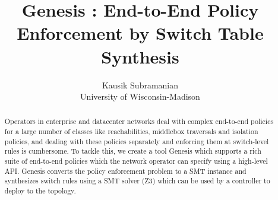 \documentclass[letterpaper,twocolumn,10pt]{sig-alternate-10pt}
\title{Genesis : End-to-End Policy Enforcement by Switch Table Synthesis }
\author{Kausik Subramanian \\
	University of Wisconsin-Madison}
\begin{document}
\maketitle

\begin{abstract}
Operators in enterprise and datacenter networks deal with complex end-to-end policies for a large number of classes like reachabilities, middlebox traversals and isolation policies, and dealing with these policies separately and enforcing them at switch-level rules is cumbersome. To tackle this, we create a tool Genesis which supports a rich suite of end-to-end policies which the network operator can specify using a high-level API. Genesis converts the policy enforcement problem to a SMT instance and synthesizes switch rules using a SMT solver (Z3) which can be used by a controller to deploy to the topology.
\end{abstract}











{}


\end{document}
